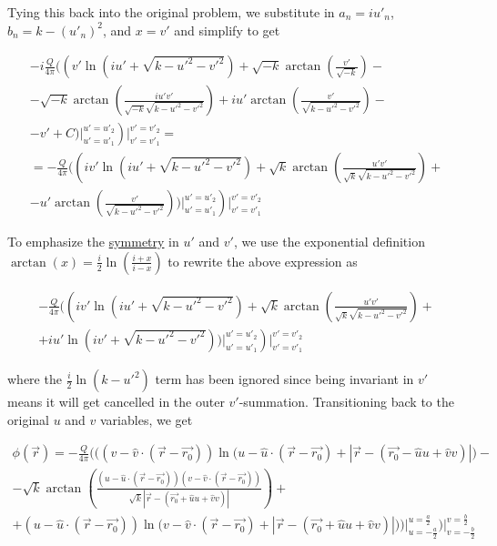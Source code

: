 ﻿\documentclass{article}
\begin{document}
Tying this back into the original problem, we substitute in $a_n = i u'_n$, $b_n = k - (u'_n)^2$, and $x = v'$ and simplify to get

\begin{multline*}
    -i \frac{Q}{4 \pi} \Bigg( \left( v' \ln \left( i u' + \sqrt{k - u'^2 - v'^2} \right) + \sqrt{-k} \arctan \left( \frac{v'}{\sqrt{-k}} \right) - \right. \\
    - \sqrt{-k} \arctan \left( \frac{i u' v'}{\sqrt{-k} \sqrt{k - u'^2 - v'^2}} \right) + i u' \arctan \left( \frac{v'}{\sqrt{k - u'^2 - v'^2}} \right) - \\
    \left. - v' + C \bigg) \bigg|_{u' = u'_1}^{u' = u'_2} \right) \bigg|_{v' = v'_1}^{v' = v'_2} = \\
    = - \frac{Q}{4 \pi} \Bigg( \left( i v' \ln \left( i u' + \sqrt{k - u'^2 - v'^2} \right) + \sqrt{k} \arctan \left( \frac{u' v'}{\sqrt{k} \sqrt{k - u'^2 - v'^2}} \right) + \right. \\
    \left. - u' \arctan \left( \frac{v'}{\sqrt{k - u'^2 - v'^2}} \right) \bigg) \bigg|_{u' = u'_1}^{u' = u'_2} \right) \bigg|_{v' = v'_1}^{v' = v'_2}
\end{multline*}

To emphasize the \href{https://en.wikipedia.org/wiki/Symmetry}{symmetry} in $u'$ and $v'$, we use the exponential definition $\arctan(x) = \frac{i}{2} \ln \left( \frac{i + x}{i - x} \right)$ to rewrite the above expression as

\begin{multline*}
    - \frac{Q}{4 \pi} \Bigg( \left( i v' \ln \left( i u' + \sqrt{k - u'^2 - v'^2} \right) + \sqrt{k} \arctan \left( \frac{u' v'}{\sqrt{k} \sqrt{k - u'^2 - v'^2}} \right) + \right. \\
    \left. + i u' \ln \left( i v' + \sqrt{k - u'^2 - v'^2} \right) \bigg) \bigg|_{u' = u'_1}^{u' = u'_2} \right) \bigg|_{v' = v'_1}^{v' = v'_2}
\end{multline*}

where the $\frac{i}{2} \ln(k - u'^2)$ term has been ignored since being invariant in $v'$ means it will get cancelled in the outer $v'$-summation. Transitioning back to the original $u$ and $v$ variables, we get

\begin{multline}
    \label{eq:SolutionToTheEquationForTheEffectOfARectangularSourcePanelOnTheVelocityPotential}
    \phi(\vec{r}) = - \frac{Q}{4 \pi} \Bigg( \bigg( (v - \hat{v} \cdot (\vec{r} - \vec{r_0})) \ln \big( u - \hat{u} \cdot (\vec{r} - \vec{r_0}) + |\vec{r} - (\vec{r_0} - \hat{u} u + \hat{v} v)| \big) - \\ 
    - \sqrt{k} \arctan \left( \frac{(u - \hat{u} \cdot (\vec{r} - \vec{r_0})) (v - \hat{v} \cdot (\vec{r} - \vec{r_0}))}{\sqrt{k} |\vec{r} - (\vec{r_0} + \hat{u} u + \hat{v} v)|} \right) + \\
    + (u - \hat{u} \cdot (\vec{r} - \vec{r_0})) \ln \big( v - \hat{v} \cdot (\vec{r} - \vec{r_0}) + |\vec{r} - (\vec{r_0} + \hat{u} u + \hat{v} v)| \big) \bigg) \bigg|_{u = - \frac{a}{2}}^{u = \frac{a}{2}} \Bigg) \bigg|_{v = - \frac{b}{2}}^{v = \frac{b}{2}}
\end{multline}
\end{document}
